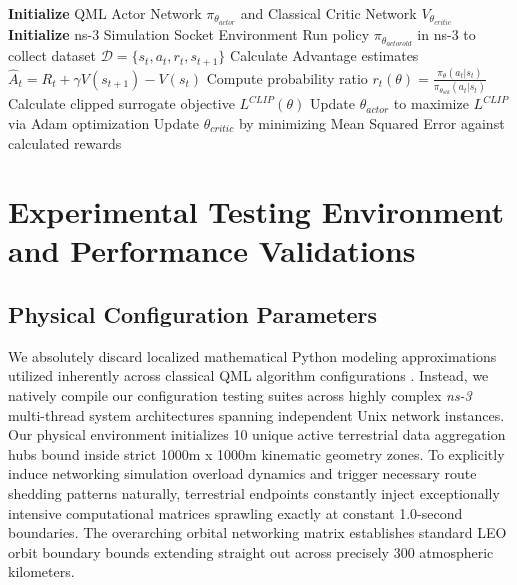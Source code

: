 \documentclass[conference]{IEEEtran}
\begin{document}
\begin{algorithm}
\caption{Quantum PPO SAGIN Controller}
\begin{algorithmic}[1]
\STATE \textbf{Initialize} QML Actor Network $\pi_{\theta_{actor}}$ and Classical Critic Network $V_{\theta_{critic}}$
\STATE \textbf{Initialize} ns-3 Simulation Socket Environment
    \STATE Run policy $\pi_{\theta_{actorold}}$ in ns-3 to collect dataset $\mathcal{D} = \{s_t, a_t, r_t, s_{t+1}\}$
    \STATE Calculate Advantage estimates $\hat{A}_t = R_t + \gamma V(s_{t+1}) - V(s_t)$
        \STATE Compute probability ratio $r_t(\theta) = \frac{\pi_\theta(a_t|s_t)}{\pi_{\theta_{old}}(a_t|s_t)}$
        \STATE Calculate clipped surrogate objective $L^{CLIP}(\theta)$
        \STATE Update $\theta_{actor}$ to maximize $L^{CLIP}$ via Adam optimization
        \STATE Update $\theta_{critic}$ by minimizing Mean Squared Error against calculated rewards
    \ENDFOR
\ENDFOR
\end{algorithmic}
\label{algo:qppo}
\end{algorithm}

\section{Experimental Testing Environment and Performance Validations}

\subsection{Physical Configuration Parameters}
We absolutely discard localized mathematical Python modeling approximations utilized inherently across classical QML algorithm configurations \cite{sasinda2025}. Instead, we natively compile our configuration testing suites across highly complex \textit{ns-3} multi-thread system architectures spanning independent Unix network instances. Our physical environment initializes 10 unique active terrestrial data aggregation hubs bound inside strict 1000m x 1000m kinematic geometry zones. To explicitly induce networking simulation overload dynamics and trigger necessary route shedding patterns naturally, terrestrial endpoints constantly inject exceptionally intensive computational matrices sprawling exactly at constant 1.0-second boundaries. The overarching orbital networking matrix establishes standard LEO orbit boundary bounds extending straight out across precisely 300 atmospheric kilometers.
\end{document}
